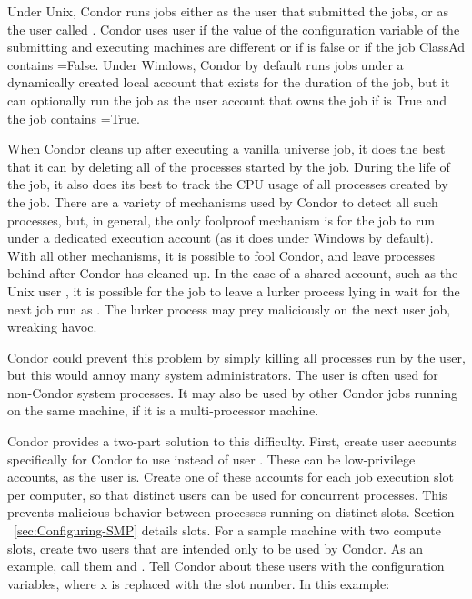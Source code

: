 Under Unix, Condor runs jobs either as the user that submitted the
jobs, or as the user called .  Condor uses user
 if the value of the  configuration
variable of the submitting and executing machines are different or if
 is false or if the job ClassAd
contains =False.  Under Windows, Condor by default
runs jobs under a dynamically created local account that exists for
the duration of the job, but it can optionally run the job as the user
account that owns the job if  is
True and the job contains =True.

When Condor cleans up after executing a vanilla universe job, it does
the best that it can by deleting all of the processes started by the
job.  During the life of the job, it also does its best to track the
CPU usage of all processes created by the job.  There are a variety of
mechanisms used by Condor to detect all such processes, but, in
general, the only foolproof mechanism is for the job to run under a
dedicated execution account (as it does under Windows by default).
With all other mechanisms, it is possible to fool Condor, and leave
processes behind after Condor has cleaned up.  In the case of a shared
account, such as the Unix user , it is possible for the
job to leave a lurker process lying in wait for the next job run as
.  The lurker process may prey maliciously on the next
 user job, wreaking havoc.

Condor could prevent this problem by simply killing all processes run by
the  user, but this would annoy many system administrators.
The  user is often used for non-Condor system processes.
It may also be used by other Condor jobs running on the same machine, if
it is a multi-processor machine.

Condor provides a two-part solution to this difficulty.
First, create user accounts specifically for Condor to use instead
of user .
These can be low-privilege accounts,
as the  user is.
Create one of these accounts for each job execution slot per computer,
so that distinct users can be used for concurrent processes.
This prevents malicious behavior between
processes running on distinct slots.
Section ~\ref{sec:Configuring-SMP} details slots.
For a sample machine with two compute slots,
create two users that are intended only to be used by Condor.
As an example, call them  and .
Tell Condor about these users
with the  configuration variables,
where x is replaced with the slot number.
In this example:

